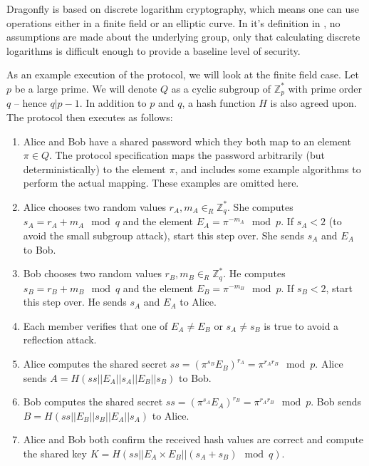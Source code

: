 
Dragonfly is based on discrete logarithm cryptography, which means one can use operations either in a finite field
or an elliptic curve. In it's definition in \cite{Ha15}, no assumptions are made about the underlying group, only that
calculating discrete logarithms is difficult enough to provide a baseline level of security.

As an example execution of the protocol, we will look at the finite field case. Let $p$ be a large prime. We will denote $Q$ as a cyclic subgroup
of $\mathbb{Z}_p^*$ with prime order $q$ -- hence $q | p-1$. In addition to $p$ and $q$, a hash function $H$ is also agreed upon.
The protocol then executes as follows:

\begin{enumerate}
    \item Alice and Bob have a shared password which they both map to an element $\pi \in Q$. The protocol specification maps the password
        arbitrarily (but deterministically) to the element $\pi$, and includes some example algorithms to perform the actual mapping. These
        examples are omitted here.
    \item Alice chooses two random values $r_A, m_A \in_R \mathbb{Z}_q^*$. She computes $s_A = r_A + m_A \mod q$ and the element
        $E_A = \pi^{-m_A} \mod p$. If $s_A < 2$ (to avoid the small subgroup attack), start this step over. She sends $s_A$ and $E_A$ to Bob.
        \label{enum:dragonfly2}
    \item Bob chooses two random values $r_B, m_B \in_R \mathbb{Z}_q^*$. He computes $s_B = r_B + m_B \mod q$ and the element
        $E_B = \pi^{-m_B} \mod p$. If $s_B < 2$, start this step over. He sends $s_A$ and $E_A$ to Alice.
        \label{enum:dragonfly3}
    \item Each member verifies that one of $E_A \neq E_B$ or $s_A \neq s_B$ is true to avoid a reflection attack.
    \item Alice computes the shared secret $ss = (\pi^{s_B} E_B)^{r_A} = \pi^{r_A r_B} \mod p$. Alice sends $A = H(ss || E_A || s_A || E_B || s_B)$ to Bob.
    \item Bob computes the shared secret $ss = (\pi^{s_A} E_A)^{r_B} = \pi^{r_A r_B} \mod p$. Bob sends $B = H(ss || E_B || s_B || E_A || s_A)$ to Alice.
    \item Alice and Bob both confirm the received hash values are correct and compute the shared key $K = H(ss || E_A \times E_B || (s_A + s_B) \mod q)$.
\end{enumerate}

